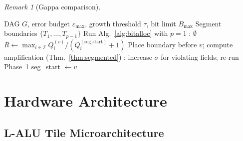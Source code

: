 \documentclass[11pt,a4paper]{article}
\theoremstyle{definition}
\theoremstyle{plain}
\theoremstyle{remark}
\newtheorem{remark}{Remark}[section]
\begin{document}
\begin{remark}[Gappa comparison]
\begin{algorithm}[H]
\caption{Greedy Segmentation with Error Budget}
\label{alg:segment}
\begin{algorithmic}[1]
\REQUIRE DAG $G$, error budget $\varepsilon_{\max}$, growth threshold $\tau$, bit limit $B_{\max}$
\ENSURE Segment boundaries $\{T_1,\ldots,T_{p-1}\}$
\STATE Run Alg.~\ref{alg:bitalloc} with $p=1$
: \RETURN $\emptyset$ \ENDIF
{}
  \STATE $R \leftarrow \max_{i\in\mathcal{I}} Q_i^{(v)}/(Q_i^{(\mathrm{seg\_start})}+1)$
    \STATE Place boundary before $v$; compute amplification (Thm.~\ref{thm:segmented})
    : increase $\sigma$ for violating fields; re-run Phase~1 \ENDIF
    \STATE seg\_start $\leftarrow v$
  \ENDIF
\ENDFOR
\end{algorithmic}
\end{algorithm}

\section{Hardware Architecture}
\label{sec:hw}

\subsection{L-ALU Tile Microarchitecture}


\end{remark}
\end{document}
